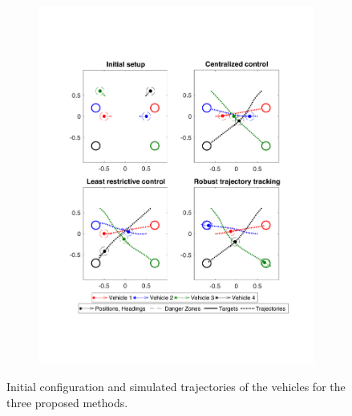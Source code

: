 \begin{figure}[t!]
\begin{subfigure}{.7\columnwidth}
  \includegraphics[width=\columnwidth]{fig/trajs_legend}
\end{subfigure}%
  \caption{Initial configuration and simulated trajectories of the vehicles for the three proposed methods.}
  \label{fig:allTrajs}
\end{figure}  

